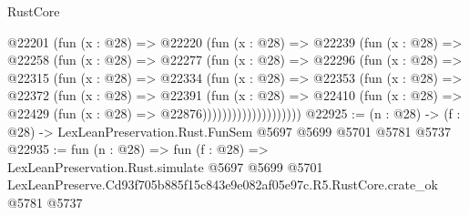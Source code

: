 \begin{lexlean}{RustCore}
\begin{coremodule}
                @22201
                  (fun (x : @28) =>
                  @22220
                    (fun (x : @28) =>
                    @22239
                      (fun (x : @28) =>
                      @22258
                        (fun (x : @28) =>
                        @22277
                          (fun (x : @28) =>
                          @22296
                            (fun (x : @28) =>
                            @22315
                              (fun (x : @28) =>
                              @22334
                                (fun (x : @28) =>
                                @22353
                                  (fun (x : @28) =>
                                  @22372
                                    (fun (x : @28) =>
                                    @22391
                                      (fun (x : @28) =>
                                      @22410
                                        (fun (x : @28) =>
                                        @22429 (fun (x : @28) => @22876))))))))))))))))))))
@22925 := (n : @28) -> (f : @28) -> LexLeanPreservation.Rust.FunSem @5697 @5699 @5701 @5781 @5737
@22935 := fun (n : @28) =>
  fun (f : @28) =>
  LexLeanPreservation.Rust.simulate
    @5697
    @5699
    @5701
    LexLeanPreserve.Cd93f705b885f15c843e9e082af05e97c.R5.RustCore.crate_ok
    @5781
    @5737
\end{coremodule}
\end{lexlean}

